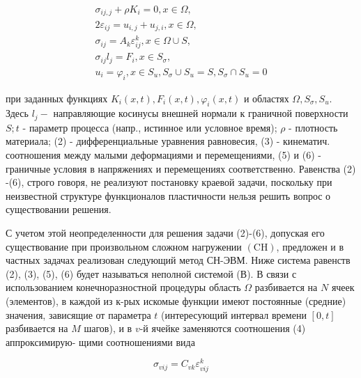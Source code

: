 \documentclass[10pt]{article}
\begin{document}
\[

\begin{gathered}

\sigma_{i j, j}+\rho K_{i}=0, x \in \Omega, \\

2 \varepsilon_{i j}=u_{i, j}+u_{j, i}, x \in \Omega, \\

\sigma_{i j}=A_{k} \varepsilon_{i j}^{k}, x \in \Omega \cup S, \\

\sigma_{i j} l_{j}=F_{i}, x \in S_{\sigma}, \\

u_{i}=\varphi_{i}, x \in S_{u}, S_{\sigma} \cup S_{u}=S, S_{\sigma} \cap S_{u}=0

\end{gathered}

\]



при заданных функциях $K_{i}(x, t), F_{i}(x, t), \varphi_{i}(x, t)$ и областях $\Omega, S_{\sigma}, S_{u}$. Здесь $l_{j}-$ направляющие косинусы внешней нормали к граничной поверхности $S ; t$ - параметр процесса (напр., истинное или условное время); $\rho$ - плотность материала; (2) - дифференциальные уравнения равновесия, (3) - кинематич. соотношения между малыми деформациями и перемещениями, (5) и (6) - граничные условия в напряжениях и перемещениях соответственно. Равенства (2) -(6), строго говоря, не реализуют постановку краевой задачи, поскольку при неизвестной структуре функционалов пластичности нельзя решить вопрос о существовании решения.



С учетом этой неопределенности для решения задачи (2)-(6), допуская его существование при произвольном сложном нагружении $(\mathrm{CH})$, предложен и в частных задачах реализован следующий метод СН-ЭВМ. Ниже система равенств (2), (3), (5), (6) будет называться неполной системой (В). В связи с использованием конечноразностной процедуры область $\Omega$ разбивается на $N$ ячеек (элементов), в каждой из к-рых искомые функции имеют постоянные (средние) значения, зависящие от параметра $t$ (интересующий интервал времени $[0, t]$ разбивается на $M$ шагов), и в $v$-й ячейке заменяются соотношения (4) аппроксимирую- щими соотношениями вида



\[

\sigma_{v i j}=C_{v k} \varepsilon_{v i j}^{k}

\]
\end{document}
